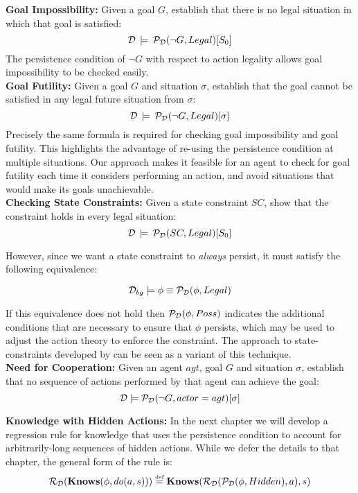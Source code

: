 \textbf{Goal Impossibility:} Given a goal $G$, establish that there
is no legal situation in which that goal is satisfied:\[
\mathcal{D}\,\models\,\mathcal{P}_{\mathcal{D}}(\neg G,Legal)[S_{0}]\]
 The persistence condition of $\neg G$ with respect to action legality
allows goal impossibility to be checked easily.\\


\textbf{Goal Futility:} Given a goal $G$ and situation $\sigma$,
establish that the goal cannot be satisfied in any legal future situation
from $\sigma$:\[
\mathcal{D}\,\models\,\mathcal{P}_{\mathcal{D}}(\neg G,Legal)[\sigma]\]
 Precisely the same formula is required for checking goal impossibility
and goal futility. This highlights the advantage of re-using the persistence
condition at multiple situations. Our approach makes it feasible for
an agent to check for goal futility each time it considers performing
an action, and avoid situations that would make its goals unachievable.\\


\textbf{Checking State Constraints:} Given a state constraint $SC$,
show that the constraint holds in every legal situation:\[
\mathcal{D}\,\models\,\mathcal{P}_{\mathcal{D}}(SC,Legal)[S_{0}]\]


However, since we want a state constraint to \emph{always} persist,
it must satisfy the following equivalence:

\[
\mathcal{D}_{bg}\models\phi\equiv\mathcal{P}_{\mathcal{D}}(\phi,Legal)\]


If this equivalence does not hold then $\mathcal{P}_{\mathcal{D}}(\phi,Poss)$ indicates
the additional conditions that are necessary to ensure that $\phi$
persists, which may be used to adjust the action theory to enforce
the constraint. The approach to state-constraints developed by \citet{Lin94-StateConstraints}
can be seen as a variant of this technique.\\


\textbf{Need for Cooperation:} Given an agent $agt$, goal $G$ and
situation $\sigma$, establish that no sequence of actions performed
by that agent can achieve the goal:\[
\mathcal{D}\models\mathcal{P}_{\mathcal{D}}(\neg G,actor=agt)[\sigma]\]


\textbf{Knowledge with Hidden Actions:} In the next chapter we will
develop a regression rule for knowledge that uses the persistence
condition to account for arbitrarily-long sequences of hidden actions.
While we defer the details to that chapter, the general form of the
rule is:\[
\mathcal{R}_{\mathcal{D}}(\mathbf{Knows}(\phi,do(a,s)))\stackrel{\mbox{\tiny def}}{=}\mathbf{Knows}(\mathcal{R}_{\mathcal{D}}(\mathcal{P}_{\mathcal{D}}(\phi,Hidden),a),s)\]



